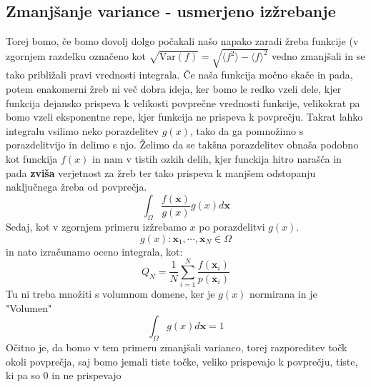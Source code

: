 \documentclass[11pt, a4paper]{article}
\begin{document}
\subsection{Zmanjšanje variance - usmerjeno izžrebanje}
Torej bomo, če bomo dovolj dolgo počakali našo napako zaradi žreba funkcije (v zgornjem razdelku označeno kot $\sqrt{\mathrm{Var}(f)}= \sqrt{ \langle f^2 \rangle  - \langle f \rangle^2}$ vedno zmanjšali in se tako približali pravi vrednosti integrala. Če naša funkcija močno skače in pada, potem enakomerni žreb ni več dobra ideja, ker bomo le redko vzeli dele, kjer funkcija dejansko prispeva k velikosti povprečne vrednosti funkcije, velikokrat pa bomo vzeli eksponentne repe, kjer funkcija ne prispeva k povprečju. Takrat lahko integralu vsilimo neko porazdelitev $g(x)$, tako da ga pomnožimo s porazdelitvijo in delimo s njo. Želimo da se takšna porazdelitev obnaša podobno kot funckija $f(x)$ in nam v tistih ozkih delih, kjer funckija hitro narašča in pada \textbf{zviša} verjetnost za žreb ter tako prispeva k manjšem odstopanju naključnega žreba od povprečja.
\begin{equation}
 \int_{\Omega} \frac{f(\mathbf{x})}{g(x)}  g(x)  d \mathbf{x}
\end{equation} 
Sedaj, kot v zgornjem primeru izžrebamo $x$ po porazdelitvi $g(x)$.
\begin{equation}
g(x): {\mathbf{x}}_1, \cdots, \mathbf{x}_N\in \Omega
\end{equation}
in nato izračunamo oceno integrala, kot:
\begin{equation}
Q_{N} = {\frac  {1}{N}}\sum _{{i=1}}^{N}{\frac  {f({\mathbf  {x}}_{i})}{p({\mathbf  {x}}_{i})}}
\end{equation}
Tu ni treba množiti s volumnom domene, ker je $g(x)$ normirana in je "Volumen"
\begin{equation}
\int_{\Omega} g(x)  d \mathbf{x} = 1
\end{equation}
Očitno je, da bomo v tem primeru zmanjšali varianco, torej razporeditev točk okoli povprečja, saj bomo jemali tiste točke, veliko prispevajo k povprečju, tiste, ki pa so $0$ in ne prispevajo 
\end{document}
